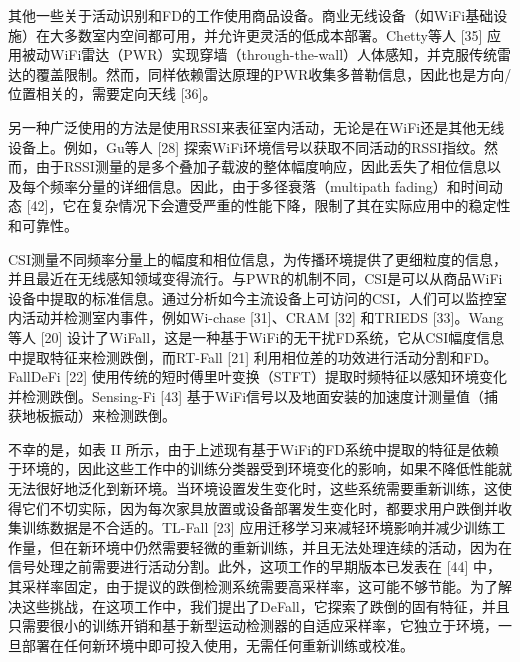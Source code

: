 \documentclass[journal]{IEEEtran}
\begin{document}
其他一些关于活动识别和FD的工作使用商品设备。商业无线设备（如WiFi基础设施）在大多数室内空间都可用，并允许更灵活的低成本部署。Chetty等人 [35] 应用被动WiFi雷达（PWR）实现穿墙（through-the-wall）人体感知，并克服传统雷达的覆盖限制。然而，同样依赖雷达原理的PWR收集多普勒信息，因此也是方向/位置相关的，需要定向天线 [36]。

另一种广泛使用的方法是使用RSSI来表征室内活动，无论是在WiFi还是其他无线设备上。例如，Gu等人 [28] 探索WiFi环境信号以获取不同活动的RSSI指纹。然而，由于RSSI测量的是多个叠加子载波的整体幅度响应，因此丢失了相位信息以及每个频率分量的详细信息。因此，由于多径衰落（multipath fading）和时间动态 [42]，它在复杂情况下会遭受严重的性能下降，限制了其在实际应用中的稳定性和可靠性。

CSI测量不同频率分量上的幅度和相位信息，为传播环境提供了更细粒度的信息，并且最近在无线感知领域变得流行。与PWR的机制不同，CSI是可以从商品WiFi设备中提取的标准信息。通过分析如今主流设备上可访问的CSI，人们可以监控室内活动并检测室内事件，例如Wi-chase [31]、CRAM [32] 和TRIEDS [33]。Wang等人 [20] 设计了WiFall，这是一种基于WiFi的无干扰FD系统，它从CSI幅度信息中提取特征来检测跌倒，而RT-Fall [21] 利用相位差的功效进行活动分割和FD。FallDeFi [22] 使用传统的短时傅里叶变换（STFT）提取时频特征以感知环境变化并检测跌倒。Sensing-Fi [43] 基于WiFi信号以及地面安装的加速度计测量值（捕获地板振动）来检测跌倒。

\begin{table}[htbp]
\centering
\caption{不同的基于CSI的FD方法及其声称的性能的简要总结}
\end{table}

不幸的是，如表 II 所示，由于上述现有基于WiFi的FD系统中提取的特征是依赖于环境的，因此这些工作中的训练分类器受到环境变化的影响，如果不降低性能就无法很好地泛化到新环境。当环境设置发生变化时，这些系统需要重新训练，这使得它们不切实际，因为每次家具放置或设备部署发生变化时，都要求用户跌倒并收集训练数据是不合适的。TL-Fall [23] 应用迁移学习来减轻环境影响并减少训练工作量，但在新环境中仍然需要轻微的重新训练，并且无法处理连续的活动，因为在信号处理之前需要进行活动分割。此外，这项工作的早期版本已发表在 [44] 中，其采样率固定，由于提议的跌倒检测系统需要高采样率，这可能不够节能。为了解决这些挑战，在这项工作中，我们提出了DeFall，它探索了跌倒的固有特征，并且只需要很小的训练开销和基于新型运动检测器的自适应采样率，它独立于环境，一旦部署在任何新环境中即可投入使用，无需任何重新训练或校准。
\end{document}
